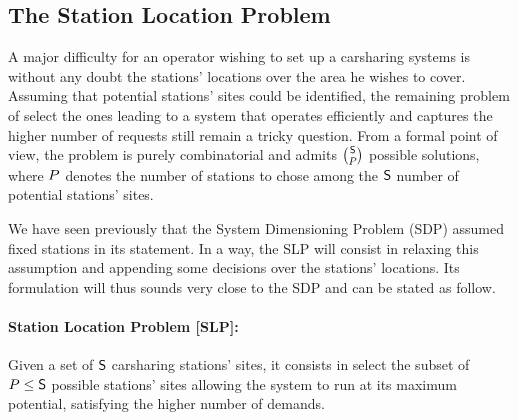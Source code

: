 \begin{bibunit}[ieeetr]
\section{The Station Location Problem}
A major difficulty for an operator wishing to set up a carsharing systems is without any doubt the stations' locations over the area he wishes to cover.
Assuming that potential stations' sites could be identified, the remaining problem of select the ones leading to a system that operates efficiently and captures the higher number of requests still remain a tricky question.
From a formal point of view, the problem is purely combinatorial and admits $\binom{\mathsf{S}}{P}$ possible solutions, where $P$ denotes the number of stations to chose among the $\mathsf{S}$ number of potential stations' sites.\medbreak

We have seen previously that the System Dimensioning Problem (SDP) assumed fixed stations in its statement.
In a way, the SLP will consist in relaxing this assumption and appending some decisions over the stations' locations.
Its formulation will thus sounds very close to the SDP and can be stated as follow.

\paragraph{Station Location Problem [SLP]:}
Given a set of $\mathsf{S}$ carsharing stations' sites, it consists in select the subset of $P \leq \mathsf{S}$ possible stations' sites allowing the system to run at its maximum potential, \ie satisfying the higher number of demands. 


\end{bibunit}
